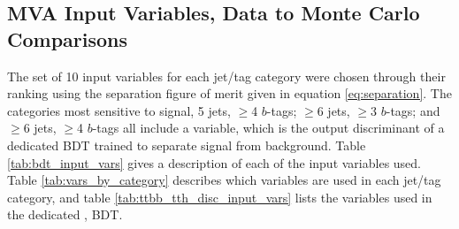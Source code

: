 \subsection{MVA Input Variables, Data to Monte Carlo Comparisons}
\label{mva_input_vars_data_to_mc_II_overview}

\par The set of 10 input variables for each jet/tag category were
chosen through their ranking using the separation figure of merit
given in equation \ref{eq:separation}.  The categories most sensitive
to signal, 5 jets, $\ge$4 $b$-tags; $\ge$6 jets, $\ge$3 $b$-tags; and
$\ge$6 jets, $\ge$4 $b$-tags all include a variable, which is the
output discriminant of a dedicated BDT trained to separate \ttH signal
from \ttbb background.  Table \ref{tab:bdt_input_vars} gives a
description of each of the input variables used.  Table
\ref{tab:vars_by_category} describes which variables are used in each
jet/tag category, and table \ref{tab:ttbb_tth_disc_input_vars} lists
the variables used in the dedicated \ttH, \ttbb BDT.  

